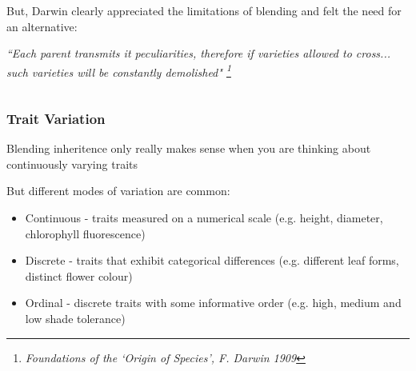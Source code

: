 \documentclass{beamer}
\begin{document}
\begin{frame}
\begin{columns}
\begin{column}{0.5\textwidth}
	But, Darwin clearly appreciated the limitations of blending and felt the need for an alternative:
	
	\vspace{10pt}
	
	\textit{``Each parent transmits it peculiarities, therefore if varieties allowed to cross... such varieties will be constantly demolished" \footnote[2]{\textit{ Foundations of the `Origin of Species', F. Darwin 1909}}}
\end{column}
	\end{columns}
	
	
	
\end{frame}


\begin{frame}

	\frametitle{Trait Variation}

	Blending inheritence only really makes sense when you are thinking about continuously varying traits
	
	\vspace{5pt}

But different modes of variation are common:\pause
\begin{itemize}
	\item Continuous  - traits measured on a numerical scale (e.g. height, diameter, chlorophyll fluorescence) \pause
	\item Discrete - traits that exhibit categorical differences (e.g. different leaf forms, distinct flower colour) \pause
	\item Ordinal - discrete traits with some informative order (e.g. high, medium and low shade tolerance)
	
\end{itemize}

\end{frame}
\end{document}
